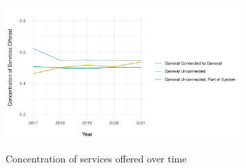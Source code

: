 \documentclass[12pt]{article}
\begin{document}
    \begin{figure}[ht!]
        \centering
        \caption{Concentration of services offered over time}
        \includegraphics[width=0.8\textwidth]{Objects/concentration_services_time.pdf}
        \label{fig:concentration_services_time}
    \end{figure}

    \newpage


    \printbibliography


    

    

    

    

    

	
	
	
\end{document}
